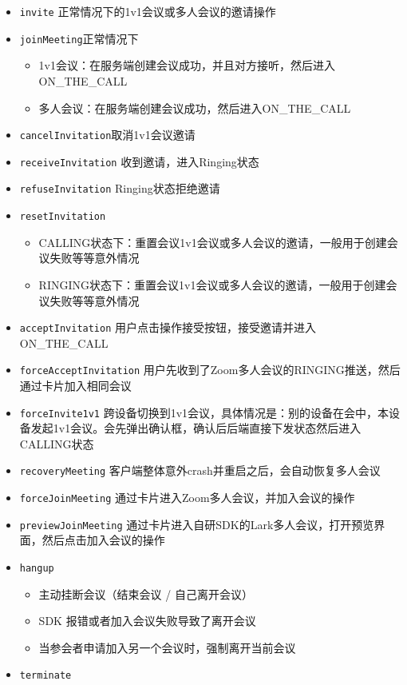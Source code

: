 \documentclass[]{ctexart}
\begin{document}
\begin{itemize}
\item
  \texttt{invite} 正常情况下的1v1会议或多人会议的邀请操作
\item
  \texttt{joinMeeting}正常情况下

  \begin{itemize}
  \item
    1v1会议：在服务端创建会议成功，并且对方接听，然后进入ON\_THE\_CALL
  \item
    多人会议：在服务端创建会议成功，然后进入ON\_THE\_CALL
  \end{itemize}
\item
  \texttt{cancelInvitation}取消1v1会议邀请
\item
  \texttt{receiveInvitation} 收到邀请，进入Ringing状态
\item
  \texttt{refuseInvitation} Ringing状态拒绝邀请
\item
  \texttt{resetInvitation}

  \begin{itemize}
  \item
    CALLING状态下：重置会议1v1会议或多人会议的邀请，一般用于创建会议失败等等意外情况
  \item
    RINGING状态下：重置会议1v1会议或多人会议的邀请，一般用于创建会议失败等等意外情况
  \end{itemize}
\item
  \texttt{acceptInvitation}
  用户点击操作接受按钮，接受邀请并进入ON\_THE\_CALL
\item
  \texttt{forceAcceptInvitation}
  用户先收到了Zoom多人会议的RINGING推送，然后通过卡片加入相同会议
\item
  \texttt{forceInvite1v1}
  跨设备切换到1v1会议，具体情况是：别的设备在会中，本设备发起1v1会议。会先弹出确认框，确认后后端直接下发状态然后进入CALLING状态
\item
  \texttt{recoveryMeeting}
  客户端整体意外crash并重启之后，会自动恢复多人会议
\item
  \texttt{forceJoinMeeting} 通过卡片进入Zoom多人会议，并加入会议的操作
\item
  \texttt{previewJoinMeeting}
  通过卡片进入自研SDK的Lark多人会议，打开预览界面，然后点击加入会议的操作
\item
  \texttt{hangup}

  \begin{itemize}
  \item
    主动挂断会议（结束会议 / 自己离开会议）
  \item
    SDK 报错或者加入会议失败导致了离开会议
  \item
    当参会者申请加入另一个会议时，强制离开当前会议
  \end{itemize}
\item
  \texttt{terminate}


\end{itemize}
\end{document}
